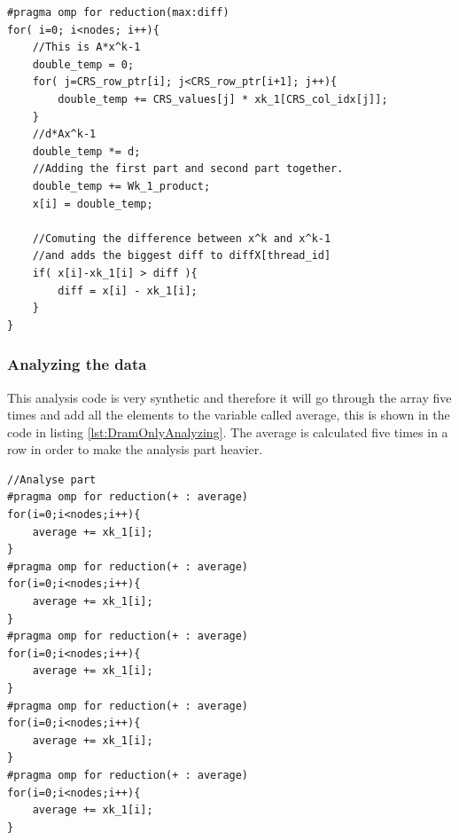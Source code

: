 \documentclass[12pt,a4paper,USenglish]{article}      %
\begin{document}
\begin{lstlisting}[caption=Generation of data.]
#pragma omp for reduction(max:diff)
for( i=0; i<nodes; i++){
	//This is A*x^k-1
	double_temp = 0;
	for( j=CRS_row_ptr[i]; j<CRS_row_ptr[i+1]; j++){
		double_temp += CRS_values[j] * xk_1[CRS_col_idx[j]];
	}
	//d*Ax^k-1
	double_temp *= d;
	//Adding the first part and second part together.
	double_temp += Wk_1_product;
	x[i] = double_temp;

	//Comuting the difference between x^k and x^k-1
	//and adds the biggest diff to diffX[thread_id]
	if( x[i]-xk_1[i] > diff ){
		diff = x[i] - xk_1[i];
	}
}
\end{lstlisting}


\clearpage
\subsubsection{Analyzing the data}
\label{sec:dramOnlyAnalyze}
This analysis code is very synthetic and therefore it will go through the array five times and add all the elements to the variable called average, this is shown in the code in listing \ref{lst:DramOnlyAnalyzing}. The average is calculated five times in a row in order to make the analysis part heavier.

\begin{lstlisting}[caption={Analyzing the data.},escapeinside={{/*!}{!*/}}, label={lst:DramOnlyAnalyzing}]
//Analyse part
#pragma omp for reduction(+ : average)
for(i=0;i<nodes;i++){
	average += xk_1[i];
}
#pragma omp for reduction(+ : average)
for(i=0;i<nodes;i++){
	average += xk_1[i];
}
#pragma omp for reduction(+ : average)
for(i=0;i<nodes;i++){
	average += xk_1[i];
}
#pragma omp for reduction(+ : average)
for(i=0;i<nodes;i++){
	average += xk_1[i];
}
#pragma omp for reduction(+ : average)
for(i=0;i<nodes;i++){
	average += xk_1[i];
}
\end{lstlisting}
\end{document}
